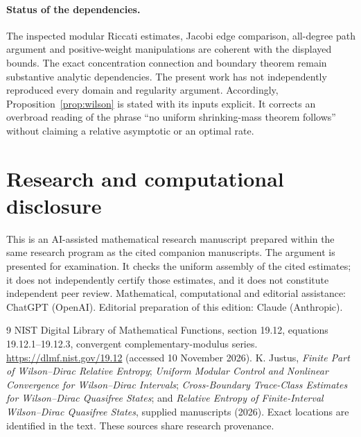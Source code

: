 \documentclass[11pt,a4paper]{article}
\theoremstyle{definition}\newtheorem{definition}[theorem]{Definition}
\begin{document}
\paragraph{Status of the dependencies.}
The inspected modular Riccati estimates, Jacobi edge comparison, all-degree path argument and positive-weight manipulations are coherent with the displayed bounds. The exact concentration connection and boundary theorem remain substantive analytic dependencies. The present work has not independently reproduced every domain and regularity argument. Accordingly, Proposition~\ref{prop:wilson} is stated with its inputs explicit. It corrects an overbroad reading of the phrase “no uniform shrinking-mass theorem follows” without claiming a relative asymptotic or an optimal rate.

\section*{Research and computational disclosure}
This is an AI-assisted mathematical research manuscript prepared within the same research program as the cited companion manuscripts. The argument is presented for examination. It checks the uniform assembly of the cited estimates; it does not independently certify those estimates, and it does not constitute independent peer review. Mathematical, computational and editorial assistance: ChatGPT (OpenAI). Editorial preparation of this edition: Claude (Anthropic).

\begin{thebibliography}{9}
 NIST Digital Library of Mathematical Functions, section 19.12, equations 19.12.1–19.12.3, convergent complementary-modulus series. \url{https://dlmf.nist.gov/19.12} (accessed 10 November 2026).
 K. Justus, \emph{Finite Part of Wilson–Dirac Relative Entropy}; \emph{Uniform Modular Control and Nonlinear Convergence for Wilson–Dirac Intervals}; \emph{Cross-Boundary Trace-Class Estimates for Wilson–Dirac Quasifree States}; and \emph{Relative Entropy of Finite-Interval Wilson–Dirac Quasifree States}, supplied manuscripts (2026). Exact locations are identified in the text. These sources share research provenance.
\end{thebibliography}
\end{document}

